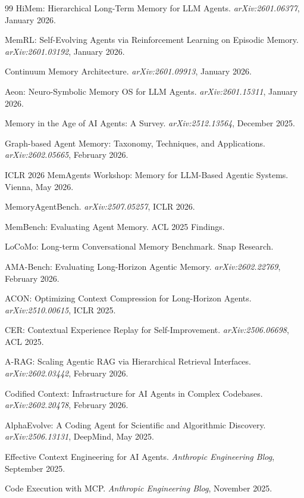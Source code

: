 \documentclass[11pt]{article}
\begin{document}
\begin{thebibliography}{99}
HiMem: Hierarchical Long-Term Memory for LLM Agents.
\textit{arXiv:2601.06377}, January 2026.

MemRL: Self-Evolving Agents via Reinforcement Learning on Episodic Memory.
\textit{arXiv:2601.03192}, January 2026.

Continuum Memory Architecture.
\textit{arXiv:2601.09913}, January 2026.

Aeon: Neuro-Symbolic Memory OS for LLM Agents.
\textit{arXiv:2601.15311}, January 2026.

Memory in the Age of AI Agents: A Survey.
\textit{arXiv:2512.13564}, December 2025.

Graph-based Agent Memory: Taxonomy, Techniques, and Applications.
\textit{arXiv:2602.05665}, February 2026.

ICLR 2026 MemAgents Workshop: Memory for LLM-Based Agentic Systems.
Vienna, May 2026.

MemoryAgentBench.
\textit{arXiv:2507.05257}, ICLR 2026.

MemBench: Evaluating Agent Memory.
ACL 2025 Findings.

LoCoMo: Long-term Conversational Memory Benchmark.
Snap Research.

AMA-Bench: Evaluating Long-Horizon Agentic Memory.
\textit{arXiv:2602.22769}, February 2026.

ACON: Optimizing Context Compression for Long-Horizon Agents.
\textit{arXiv:2510.00615}, ICLR 2025.

CER: Contextual Experience Replay for Self-Improvement.
\textit{arXiv:2506.06698}, ACL 2025.

A-RAG: Scaling Agentic RAG via Hierarchical Retrieval Interfaces.
\textit{arXiv:2602.03442}, February 2026.

Codified Context: Infrastructure for AI Agents in Complex Codebases.
\textit{arXiv:2602.20478}, February 2026.

AlphaEvolve: A Coding Agent for Scientific and Algorithmic Discovery.
\textit{arXiv:2506.13131}, DeepMind, May 2025.

Effective Context Engineering for AI Agents.
\textit{Anthropic Engineering Blog}, September 2025.

Code Execution with MCP.
\textit{Anthropic Engineering Blog}, November 2025.


\end{thebibliography}
\end{document}
